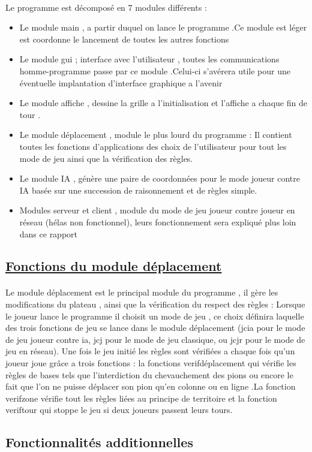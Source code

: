 \documentclass[a4paper,12pt]{article}
\begin{document}
\paragraph{}
Le programme est décomposé en 7 modules différents :
\begin{itemize}
\item Le module main , a partir duquel on lance le programme .Ce module est léger est coordonne le lancement de toutes les autres fonctions
\item Le module gui ; interface avec l'utilisateur , toutes les communications homme-programme passe par ce module .Celui-ci s'avérera utile pour une éventuelle implantation d'interface graphique a l'avenir
\item Le module affiche , dessine la grille a l'initialisation et l'affiche a chaque fin de tour .
\item Le module déplacement , module le plus lourd du programme : Il contient toutes les fonctions d'applications  des choix de l'utilisateur pour tout les mode de jeu ainsi que la vérification des règles.
\item Le module IA , génère une paire de coordonnées pour le mode joueur contre IA basée sur une succession de raisonnement et de règles simple.
\item Modules serveur et client , module du mode de jeu joueur contre joueur en réseau (hélas non fonctionnel), leurs fonctionnement sera expliqué plus loin dans ce rapport
\end{itemize}
\vspace{1cm}
\subsection{\underline{Fonctions du module déplacement }}
\paragraph{}
Le module déplacement est le principal module du programme , il gère les modifications du plateau , ainsi que la vérification du respect des règles :
\newline Lorsque le joueur lance le programme il choisit un mode de jeu , ce choix définira laquelle des trois fonctions de jeu se lance dans le module déplacement (jcia pour le mode de jeu joueur contre ia, jcj pour le mode de jeu classique, ou jcjr pour le mode de jeu en réseau). 
\newline
Une fois le jeu initié les règles sont vérifiées a chaque fois qu'un joueur joue grâce a trois fonctions : la fonctions verifdéplacement qui vérifie les règles de bases tels que l'interdiction du chevauchement des pions ou encore le fait que l'on ne puisse déplacer son pion qu'en colonne ou en ligne .La fonction verifzone vérifie tout les règles liées au principe de territoire et la fonction veriftour qui stoppe le jeu si deux joueurs passent leurs tours.
\newpage
\begin{center}
\section{Fonctionnalités additionnelles}
\end{center}
\end{document}
